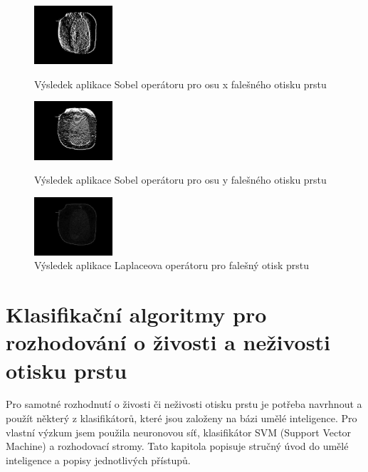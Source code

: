 \begin{figure}[!htbp]
  \begin{minipage}[b]{0.3\linewidth}
    \centering
    \includegraphics[width=110px]{obrazky-figures/sobelxfingerprint.png}
    \caption{Výsledek aplikace Sobel operátoru pro osu x falešného otisku prstu}
  \end{minipage}
  \hspace{0.3cm}
  \begin{minipage}[b]{0.3\linewidth}
    \centering
    \includegraphics[width=110px]{obrazky-figures/sobelyfingerprint.png}
    \caption{Výsledek aplikace Sobel operátoru pro osu y falešného otisku prstu}
  \end{minipage}
  \hspace{0.3cm}
    \begin{minipage}[b]{0.3\linewidth}
    \centering
    \includegraphics[width=110px]{obrazky-figures/laplacianfingerprint.png}
    \caption{Výsledek aplikace Laplaceova operátoru pro falešný otisk prstu}
  \end{minipage}
\end{figure}




\chapter{Klasifikační algoritmy pro rozhodování o živosti a neživosti otisku prstu}
Pro samotné rozhodnutí o živosti či neživosti otisku prstu je potřeba navrhnout a použít některý z klasifikátorů, které jsou založeny na bázi umělé inteligence. Pro vlastní výzkum jsem použila neuronovou síť, klasifikátor SVM (Support Vector Machine) a rozhodovací stromy. Tato kapitola popisuje stručný úvod do umělé inteligence a popisy jednotlivých přístupů.

